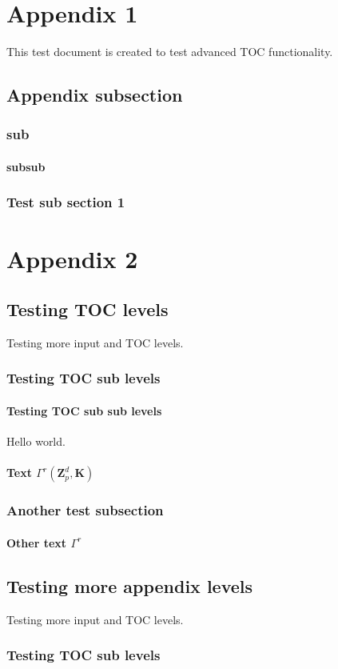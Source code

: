 \chapter{Appendix 1}
This test document is created to test advanced TOC functionality.

\section{Appendix subsection}

\subsection{sub}

\subsubsection{subsub}


\subsection{Test sub section 1}

\chapter{Appendix 2}

\section{Testing TOC levels}
Testing more input and TOC levels.

\subsection{Testing TOC sub levels}

\subsubsection{Testing TOC sub sub levels}
Hello world.

\subsubsection{Text $\Gamma^{r}(\ensuremath{{\mathbf{Z}}}_p^d,\mathbf{K})$}

\subsection{Another test subsection}

\subsubsection{Other text $\Gamma^{r}$}

\section{Testing more appendix levels}
Testing more input and TOC levels.

\subsection{Testing TOC sub levels}

